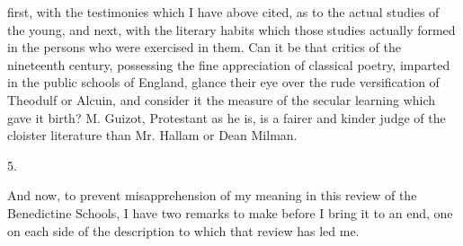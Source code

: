 first, with the testimonies which I have above cited, as to the actual
studies of the young, and next, with the literary habits which those
studies actually formed in the persons who were exercised in them. Can
it be that critics of the nineteenth century, possessing the
fine appreciation of classical poetry, imparted in the public schools
of England, glance their eye over the rude versification of Theodulf
or Alcuin, and consider it the measure of the secular learning which
gave it birth? M. Guizot, Protestant as he is, is a fairer and kinder
judge of the cloister literature than Mr. Hallam or Dean Milman.

5.

And now, to prevent misapprehension of my meaning in this review of
the Benedictine Schools, I have two remarks to make before I bring it
to an end, one on each side of the description to which that review
has led me.

